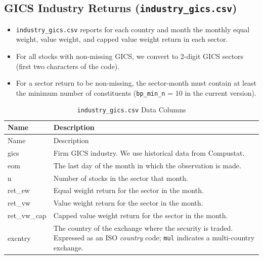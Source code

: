 \documentclass[12pt,title,fleqn]{article}
\begin{document}
\subsection{GICS Industry Returns (\texttt{industry\_gics.csv})}
\begin{itemize}
    \item \texttt{industry\_gics.csv} reports for each country and month the monthly equal weight, value weight, and capped value weight return in each sector.
    \item For all stocks with non-missing GICS, we convert to 2-digit GICS sectors (first two characters of the code).
    \item For a sector return to be non-missing, the sector-month must contain at least the minimum number of constituents (\texttt{bp\_min\_n} = 10 in the current version).

\end{itemize}

{\scriptsize
	\begin{longtable}{@{\extracolsep{\fill}}|l|m{14.2cm}|@{}}
	\caption{\texttt{industry\_gics.csv} Data Columns \label{industry_gics}}\\
	
	\hline
	Name & Description \\
	\hline
	\endfirsthead
	
	\hline
	Name & Description \\
	\hline
	\endhead
	
	\hline
	\endfoot
	
	
	\hline\hline
	\endlastfoot
	
	gics\rule{0pt}{10pt} & Firm GICS industry. We use historical data from Compustat. \\[1ex]
	
	eom & The last day of the month in which the observation is made. \\[1ex]

	n & Number of stocks in the sector that month. \\[1ex]

	ret\_ew & Equal weight return for the sector in the month.\\[1ex]

	ret\_vw & Value weight return for the sector in the month.\\[1ex]

	ret\_vw\_cap & Capped value weight return for the sector in the month.\\[1ex]

	excntry & The country of the exchange where the security is traded. Expressed as an ISO \emph{country} code; \texttt{mul} indicates a multi-country exchange. \\[1ex]

\end{longtable}}
\end{document}
